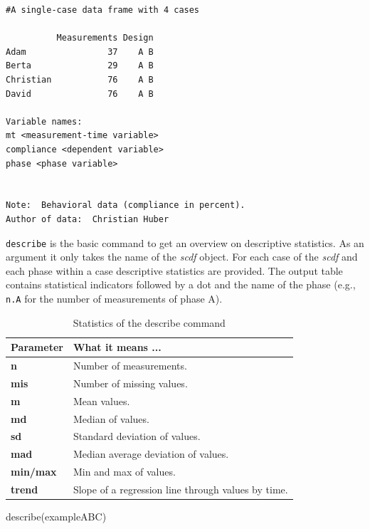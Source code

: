 \documentclass[
]{book}
\newenvironment{Shaded}{\begin{snugshade}}{\end{snugshade}}
\newcommand{\FunctionTok}[1]{\textcolor[rgb]{0.00,0.00,0.00}{#1}}
\newcommand{\NormalTok}[1]{#1}
\begin{document}
\begin{verbatim}
#A single-case data frame with 4 cases

          Measurements Design
Adam                37    A B
Berta               29    A B
Christian           76    A B
David               76    A B

Variable names:
mt <measurement-time variable>
compliance <dependent variable>
phase <phase variable>


Note:  Behavioral data (compliance in percent).
Author of data:  Christian Huber 
\end{verbatim}

\texttt{describe} is the basic command to get an overview on descriptive statistics. As an argument it only takes the name of the \emph{scdf} object. For each case of the \emph{scdf} and each phase within a case descriptive statistics are provided. The output table contains statistical indicators followed by a dot and the name of the phase (e.g., \texttt{n.A} for the number of measurements of phase A).

\begin{table}

\caption{\label{tab:table-describe}Statistics of the describe command}
\centering
\begin{tabular}[t]{>{\raggedright\arraybackslash}p{15em}>{\raggedright\arraybackslash}p{30em}}
\toprule
Parameter & What it means ...\\
\midrule
\textbf{n} & Number of measurements.\\
\textbf{mis} & Number of missing values.\\
\textbf{m} & Mean values.\\
\textbf{md} & Median of values.\\
\textbf{sd} & Standard deviation of values.\\
\addlinespace
\textbf{mad} & Median average deviation of values.\\
\textbf{min/max} & Min and max of values.\\
\textbf{trend} & Slope of a regression line through values by time.\\
\bottomrule
\end{tabular}
\end{table}

\begin{Shaded}
\begin{Highlighting}[]
\FunctionTok{describe}\NormalTok{(exampleABC)}
\end{Highlighting}
\end{Shaded}
\end{document}
